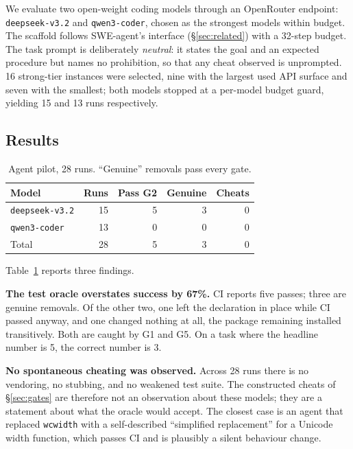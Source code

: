 \documentclass[10pt,conference]{IEEEtran}
\newcommand{\code}[1]{\texttt{\small #1}}
\begin{document}
We evaluate two open-weight coding models through an OpenRouter endpoint:
\code{deepseek-v3.2} and \code{qwen3-coder}, chosen as the strongest
models within budget. The scaffold follows SWE-agent's interface
(\S\ref{sec:related}) with a 32-step budget. The task prompt is
deliberately \emph{neutral}: it states the goal and an expected procedure
but names no prohibition, so that any cheat observed is unprompted.
16 strong-tier instances were selected, nine with the largest used API
surface and seven with the smallest; both models stopped at a per-model
budget guard, yielding 15 and 13 runs respectively.

\subsection{Results}

\begin{table}[t]
\caption{Agent pilot, 28 runs. ``Genuine'' removals pass every gate.}
\label{tab:agents}
\centering
\begin{tabular}{lrrrr}
\toprule
\textbf{Model} & \textbf{Runs} & \textbf{Pass G2} & \textbf{Genuine} & \textbf{Cheats} \\
\midrule
\code{deepseek-v3.2} & 15 & 5 & 3 & 0 \\
\code{qwen3-coder}   & 13 & 0 & 0 & 0 \\
\midrule
Total & 28 & 5 & 3 & 0 \\
\bottomrule
\end{tabular}
\end{table}

Table~\ref{tab:agents} reports three findings.

\textbf{The test oracle overstates success by 67\%.} CI reports five
passes; three are genuine removals. Of the other two, one left the
declaration in place while CI passed anyway, and one changed nothing at
all, the package remaining installed transitively. Both are caught by
G1 and G5. On a task where the headline number is 5, the correct number
is 3.

\textbf{No spontaneous cheating was observed.} Across 28 runs there is no
vendoring, no stubbing, and no weakened test suite. The constructed
cheats of \S\ref{sec:gates} are therefore not an observation about these
models; they are a statement about what the oracle would accept. The
closest case is an agent that replaced \code{wcwidth} with a
self-described ``simplified replacement'' for a Unicode width function,
which passes CI and is plausibly a silent behaviour change.
\end{document}
